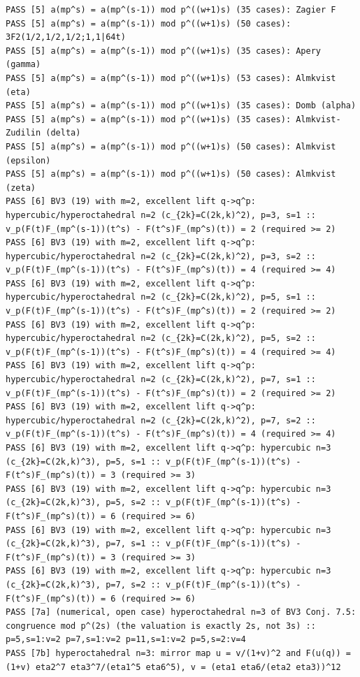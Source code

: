 \documentclass[11pt,a4paper]{article}
\theoremstyle{definition}\newtheorem{definition}[theorem]{Definition}
\theoremstyle{remark}\newtheorem{remark}[theorem]{Remark}
\numberwithin{equation}{section}
\begin{document}
\begin{lstlisting}
PASS [5] a(mp^s) = a(mp^(s-1)) mod p^((w+1)s) (35 cases): Zagier F
PASS [5] a(mp^s) = a(mp^(s-1)) mod p^((w+1)s) (50 cases): 3F2(1/2,1/2,1/2;1,1|64t)
PASS [5] a(mp^s) = a(mp^(s-1)) mod p^((w+1)s) (35 cases): Apery (gamma)
PASS [5] a(mp^s) = a(mp^(s-1)) mod p^((w+1)s) (53 cases): Almkvist (eta)
PASS [5] a(mp^s) = a(mp^(s-1)) mod p^((w+1)s) (35 cases): Domb (alpha)
PASS [5] a(mp^s) = a(mp^(s-1)) mod p^((w+1)s) (35 cases): Almkvist-Zudilin (delta)
PASS [5] a(mp^s) = a(mp^(s-1)) mod p^((w+1)s) (50 cases): Almkvist (epsilon)
PASS [5] a(mp^s) = a(mp^(s-1)) mod p^((w+1)s) (50 cases): Almkvist (zeta)
PASS [6] BV3 (19) with m=2, excellent lift q->q^p: hypercubic/hyperoctahedral n=2 (c_{2k}=C(2k,k)^2), p=3, s=1 :: v_p(F(t)F_(mp^(s-1))(t^s) - F(t^s)F_(mp^s)(t)) = 2 (required >= 2)
PASS [6] BV3 (19) with m=2, excellent lift q->q^p: hypercubic/hyperoctahedral n=2 (c_{2k}=C(2k,k)^2), p=3, s=2 :: v_p(F(t)F_(mp^(s-1))(t^s) - F(t^s)F_(mp^s)(t)) = 4 (required >= 4)
PASS [6] BV3 (19) with m=2, excellent lift q->q^p: hypercubic/hyperoctahedral n=2 (c_{2k}=C(2k,k)^2), p=5, s=1 :: v_p(F(t)F_(mp^(s-1))(t^s) - F(t^s)F_(mp^s)(t)) = 2 (required >= 2)
PASS [6] BV3 (19) with m=2, excellent lift q->q^p: hypercubic/hyperoctahedral n=2 (c_{2k}=C(2k,k)^2), p=5, s=2 :: v_p(F(t)F_(mp^(s-1))(t^s) - F(t^s)F_(mp^s)(t)) = 4 (required >= 4)
PASS [6] BV3 (19) with m=2, excellent lift q->q^p: hypercubic/hyperoctahedral n=2 (c_{2k}=C(2k,k)^2), p=7, s=1 :: v_p(F(t)F_(mp^(s-1))(t^s) - F(t^s)F_(mp^s)(t)) = 2 (required >= 2)
PASS [6] BV3 (19) with m=2, excellent lift q->q^p: hypercubic/hyperoctahedral n=2 (c_{2k}=C(2k,k)^2), p=7, s=2 :: v_p(F(t)F_(mp^(s-1))(t^s) - F(t^s)F_(mp^s)(t)) = 4 (required >= 4)
PASS [6] BV3 (19) with m=2, excellent lift q->q^p: hypercubic n=3 (c_{2k}=C(2k,k)^3), p=5, s=1 :: v_p(F(t)F_(mp^(s-1))(t^s) - F(t^s)F_(mp^s)(t)) = 3 (required >= 3)
PASS [6] BV3 (19) with m=2, excellent lift q->q^p: hypercubic n=3 (c_{2k}=C(2k,k)^3), p=5, s=2 :: v_p(F(t)F_(mp^(s-1))(t^s) - F(t^s)F_(mp^s)(t)) = 6 (required >= 6)
PASS [6] BV3 (19) with m=2, excellent lift q->q^p: hypercubic n=3 (c_{2k}=C(2k,k)^3), p=7, s=1 :: v_p(F(t)F_(mp^(s-1))(t^s) - F(t^s)F_(mp^s)(t)) = 3 (required >= 3)
PASS [6] BV3 (19) with m=2, excellent lift q->q^p: hypercubic n=3 (c_{2k}=C(2k,k)^3), p=7, s=2 :: v_p(F(t)F_(mp^(s-1))(t^s) - F(t^s)F_(mp^s)(t)) = 6 (required >= 6)
PASS [7a] (numerical, open case) hyperoctahedral n=3 of BV3 Conj. 7.5: congruence mod p^(2s) (the valuation is exactly 2s, not 3s) :: p=5,s=1:v=2 p=7,s=1:v=2 p=11,s=1:v=2 p=5,s=2:v=4
PASS [7b] hyperoctahedral n=3: mirror map u = v/(1+v)^2 and F(u(q)) = (1+v) eta2^7 eta3^7/(eta1^5 eta6^5), v = (eta1 eta6/(eta2 eta3))^12

\end{lstlisting}
\end{document}
